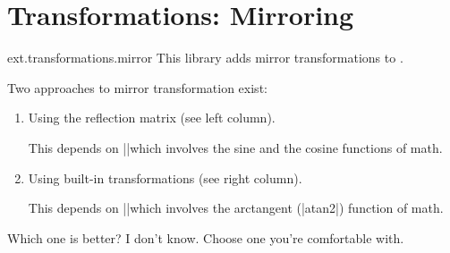 %
%
%

\section{Transformations: Mirroring}
\label{pgflibrary:transformations}

\begin{purepgflibrary}{ext.transformations.mirror}
  This library adds mirror transformations to \pgfname.
\end{purepgflibrary}

Two approaches to mirror transformation exist:
\begin{enumerate}
\item Using the reflection matrix (see left column).

  This depends on |\pgfpointnormalised|\indexCommandO\pgfpointnormalised which involves
  the sine and the cosine functions of \pgfname math.

\item Using built-in transformations (see right column).

  This depends on |\pgfmathanglebetweenpoints|\indexCommandO\pgfmathanglebetweenpoints which
  involves the arctangent (|atan2|) function of \pgfname math.
\end{enumerate}

Which one is better? I don't know.
Choose one you're comfortable with.

